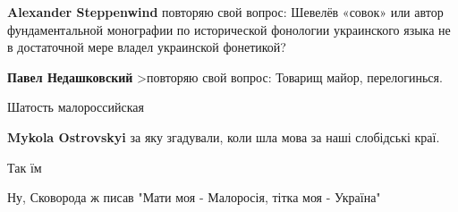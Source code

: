 \begin{itemize}
\begin{itemize}
\textbf{Alexander Steppenwind} повторяю свой вопрос: Шевелёв «совок» или автор фундаментальной монографии по исторической фонологии украинского языка не в достаточной мере владел украинской фонетикой?

\textbf{Павел Недашковский} >повторяю свой вопрос:
Товарищ майор, перелогинься.

\end{itemize} %

Шатость малороссийская

\begin{itemize} %
\textbf{Mykola Ostrovskyi} за яку згадували, коли шла мова за наші слобідські краї.
\end{itemize} %

Так їм

Ну, Сковорода ж писав "Мати моя - Малоросія, тітка моя - Україна"

\end{itemize} %

